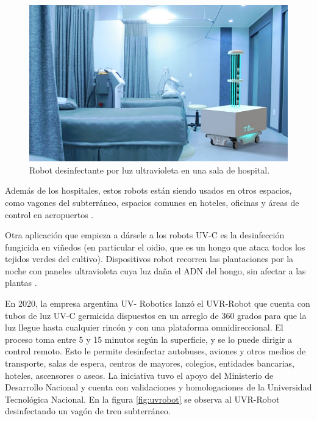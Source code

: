 \begin{figure}[h]
	\centering
	\includegraphics[width=\textwidth]{./Figures/robothospitalario.PNG}
	\caption{Robot desinfectante por luz ultravioleta en una sala de hospital\protect\footnotemark.}
	\label{fig:robotuv}
\end{figure}

Además de los hospitales, estos robots están siendo usados en otros espacios, como vagones del subterráneo, espacios comunes en hoteles, oficinas y áreas de control en aeropuertos \citep{masrobots}.

Otra aplicación que empieza a dársele a los robots UV-C es la desinfección fungicida en viñedos (en particular el oidio, que es un hongo que ataca todos los tejidos verdes del cultivo). Dispositivos robot recorren las plantaciones por la noche con paneles ultravioleta cuya luz daña el ADN del hongo, sin afectar a las plantas \citep{infowine}.

En 2020, la empresa argentina UV- Robotics lanzó el UVR-Robot \citep{UVR} que cuenta con tubos de luz UV-C germicida dispuestos en un arreglo de 360 grados para que la luz llegue hasta cualquier rincón y con una plataforma omnidireccional. El proceso toma  entre 5 y 15 minutos según la superficie, y se lo puede dirigir a control remoto. Esto le permite desinfectar autobuses, aviones y otros medios de transporte, salas de espera, centros de mayores, colegios, entidades bancarias, hoteles, ascensores o aseos. La iniciativa  tuvo el apoyo del Ministerio de Desarrollo Nacional y cuenta con validaciones y homologaciones de la Universidad Tecnológica Nacional. En la figura \ref{fig:uvrobot} se observa al UVR-Robot desinfectando un vagón de tren subterráneo. 

